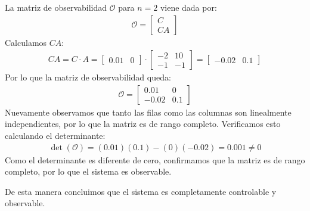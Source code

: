 \documentclass[
  11pt,
  letterpaper,
   addpoints,
   answers
  ]{exam}
\begin{document}
\begin{solution}
La matriz de observabilidad $\mathcal{O}$ para $n=2$ viene dada por:
\begin{align}
\mathcal{O} = \begin{bmatrix} C \\ CA \end{bmatrix}
\end{align}
Calculamos $CA$:
\begin{align}
CA = C \cdot A = \begin{bmatrix} 0.01 & 0 \end{bmatrix} \cdot \begin{bmatrix} -2 & 10 \\ -1 & -1 \end{bmatrix} = \begin{bmatrix} -0.02 & 0.1 \end{bmatrix}
\end{align}
Por lo que la matriz de observabilidad queda:
\begin{align}
\mathcal{O} = \begin{bmatrix} 0.01 & 0 \\ -0.02 & 0.1 \end{bmatrix}
\end{align}
Nuevamente observamos que tanto las filas como las columnas son linealmente independientes, por lo que la matriz es de rango completo. Verificamos esto calculando el determinante:
\begin{align}
\det(\mathcal{O}) = (0.01)(0.1) - (0)(-0.02) = 0.001 \neq 0
\end{align}
Como el determinante es diferente de cero, confirmamos que la matriz es de rango completo, por lo que el sistema es observable. 

De esta manera concluimos que el sistema es completamente controlable y observable.

\end{solution}
\end{document}
